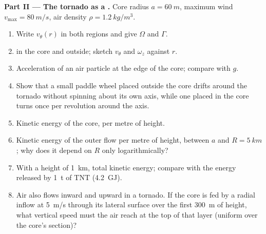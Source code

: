 \begin{problem}
\medskip
\noindent\textbf{Part II --- The tornado as a .}
Core radius $a = \qty{60}{m}$, maximum wind $v_{\max} = \qty{80}{m/s}$, air
density $\rho = \qty{1.2}{kg/m^3}$.
\begin{enumerate}[resume]
  \item Write $v_\theta(r)$ in both regions and give $\Omega$ and $\Gamma$.
  \item {} in the core and outside; sketch $v_\theta$ and $\omega_z$
        against $r$.
  \item Acceleration of an air particle at the edge of the core;
        compare with $g$.
  \item Show that a small paddle wheel placed outside the core drifts
        around the tornado without spinning about its own axis, while
        one placed in the core turns once per revolution around the
        axis.
  \item Kinetic energy of the core, per metre of height.
  \item Kinetic energy of the outer flow per metre of height, between
        $a$ and $R = \qty{5}{km}$; why does it depend on $R$ only
        logarithmically?
  \item With a height of \qty{1}{km}, total kinetic energy; compare with
        the energy released by \qty{1}{t} of TNT (\qty{4.2}{GJ}).
  \item Air also flows inward and upward in a tornado. If the core
        is fed by a radial inflow at \qty{5}{m/s} through its lateral
        surface over the first \qty{300}{m} of height, what vertical
        speed must the air reach at the top of that layer (uniform
        over the core's section)?
\end{enumerate}


\end{problem}
